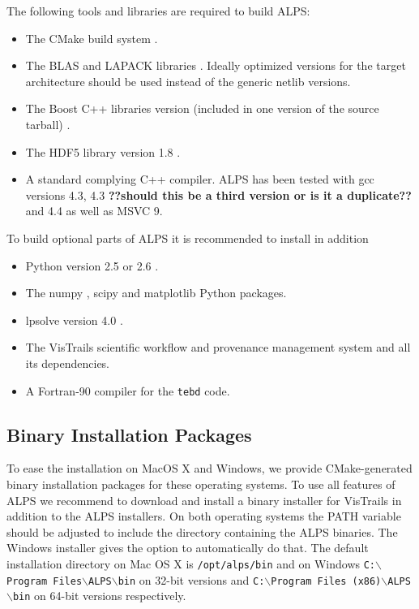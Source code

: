 \documentclass[12pt]{iopart}
\begin{document}
The following tools and libraries are required to build ALPS:

\begin{itemize}
\item The CMake build system \cite{cmake}.
\item The BLAS \cite{blasnetlib} and LAPACK libraries \cite{lapack}. Ideally optimized versions for the target architecture should be used instead of the generic netlib versions.
\item The Boost C++ libraries version (included in one version of the source tarball) \cite{boost}.
\item The HDF5 library version 1.8 \cite{hdf5}.
\item A standard complying C++ compiler. ALPS has been tested with gcc versions 4.3, 4.3 \textbf{??should this be a third version or is it a duplicate??} and 4.4 as well as MSVC 9.
\end{itemize}
To build optional parts of ALPS it is recommended to install in addition
\begin{itemize}
\item Python version 2.5 or 2.6 \cite{python}.
\item The numpy \cite{numpy}, scipy \cite{scipy} and matplotlib \cite{matplotlib} Python packages.
\item lpsolve version 4.0 \cite{lpsolve}.
\item The VisTrails scientific workflow and provenance management system \cite{vistrails} and all its dependencies.
\item A Fortran-90 compiler for the {\tt tebd} code.
\end{itemize}

\subsection{Binary Installation Packages}

To ease the installation on MacOS X and Windows, we provide CMake-generated binary installation packages for these operating systems. To use all features of ALPS we recommend to download and install a binary installer for VisTrails \cite{vistrails} in addition to the ALPS installers. On both operating systems the PATH variable should be adjusted to include the directory containing the ALPS binaries. The Windows installer gives the option to automatically do that. The default installation directory on Mac OS X is {\tt /opt/alps/bin} and on Windows {\tt C:$\backslash$Program Files$\backslash$ALPS$\backslash$bin} on 32-bit versions and  {\tt C:$\backslash$Program Files (x86)$\backslash$ALPS$\backslash$bin} on 64-bit versions respectively.
\end{document}
